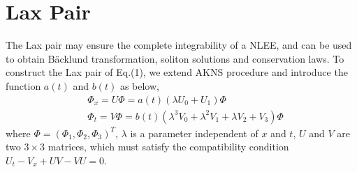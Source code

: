 \documentclass[12pt]{article}
\begin{document}
\section{Lax Pair}
    The Lax pair may ensure the complete integrability of a NLEE, and can be used to obtain B\"acklund transformation, soliton solutions and conservation laws\cite{7}. To construct the Lax pair of Eq.(1), we extend AKNS procedure and introduce the function $a(t)$ and $b(t)$ as below,
\begin{align}
  & \Phi_{x} = U\Phi = a(t)(\lambda U_{0} + U_{1})\Phi  \label{2}\\
  & \Phi_{t} = V\Phi = b(t)(\lambda^{3}V_{0} + \lambda^{2}V_{1} + \lambda V_{2} + V_{3})\Phi  \label{3}
\end{align}
where $\Phi=(\Phi_{1}, \Phi_{2}, \Phi_{3})^{T}$, $\lambda$ is a parameter independent of $x$ and $t$, $U$ and $V$ are two $3 \times 3$ matrices, which must satisfy the compatibility condition $U_{t} - V_{x} + UV - VU = 0$.
\end{document}
